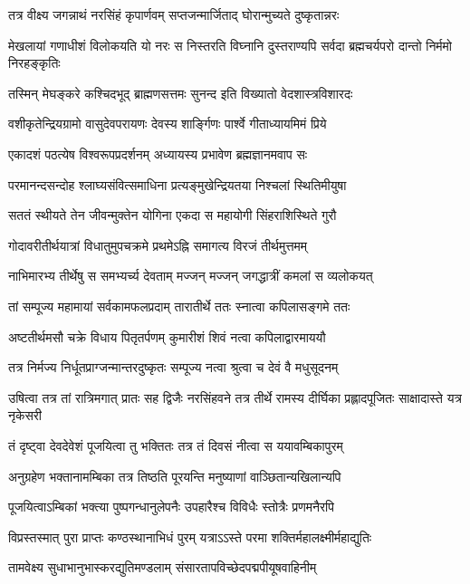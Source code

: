 \twolineshloka
{तत्र वीक्ष्य जगन्नाथं नरसिंहं कृपार्णवम्}
{सप्तजन्मार्जिताद् घोरान्मुच्यते दुष्कृतान्नरः} %

\threelineshloka
{मेखलायां गणाधीशं विलोकयति यो नरः}
{स निस्तरति विघ्नानि दुस्तराण्यपि सर्वदा}
{ब्रह्मचर्यपरो दान्तो निर्ममो निरहङ्कृतिः} %

\twolineshloka
{तस्मिन् मेघङ्करे कश्चिदभूद् ब्राह्मणसत्तमः}
{सुनन्द इति विख्यातो वेदशास्त्रविशारदः} %

\twolineshloka
{वशीकृतेन्द्रियग्रामो वासुदेवपरायणः}
{देवस्य शार्ङ्गिणः पार्श्वे गीताध्यायमिमं प्रिये} %

\twolineshloka
{एकादशं पठत्येष विश्वरूपप्रदर्शनम्}
{अध्यायस्य प्रभावेण ब्रह्मज्ञानमवाप सः} %

\twolineshloka
{परमानन्दसन्दोह श्लाघ्यसंवित्समाधिना}
{प्रत्यङ्मुखेन्द्रियतया निश्चलां स्थितिमीयुषा} %

\twolineshloka
{सततं स्थीयते तेन जीवन्मुक्तेन योगिना}
{एकदा स महायोगी सिंहराशिस्थिते गुरौ} %

\twolineshloka
{गोदावरीतीर्थयात्रां विधातुमुपचक्रमे}
{प्रथमेऽह्नि समागत्य विरजं तीर्थमुत्तमम्} %

\twolineshloka
{नाभिमारभ्य तीर्थेषु स समभ्यर्च्य देवताम्}
{मज्जन् मज्जन् जगद्धात्रीं कमलां स व्यलोकयत्} %

\twolineshloka
{तां सम्पूज्य महामायां सर्वकामफलप्रदाम्}
{तारातीर्थे ततः स्नात्वा कपिलासङ्गमे ततः} %

\twolineshloka
{अष्टतीर्थमसौ चक्रे विधाय पितृतर्पणम्}
{कुमारीशं शिवं नत्वा कपिलाद्वारमाययौ} %

\twolineshloka
{तत्र निर्मज्य निर्धूतप्राग्जन्मान्तरदुष्कृतः}
{सम्पूज्य नत्वा श्रुत्वा च देवं वै मधुसूदनम्} %

\threelineshloka
{उषित्वा तत्र तां रात्रिमगात् प्रातः सह द्विजैः}
{नरसिंहवने तत्र तीर्थे रामस्य दीर्घिका}
{प्रह्लादपूजितः साक्षादास्ते यत्र नृकेसरी} %

\twolineshloka
{तं दृष्ट्वा देवदेवेशं पूजयित्वा तु भक्तितः}
{तत्र तं दिवसं नीत्वा स ययावम्बिकापुरम्} %

\twolineshloka
{अनुग्रहेण भक्तानामम्बिका तत्र तिष्ठति}
{पूरयन्ति मनुष्याणां वाञ्छितान्यखिलान्यपि} %

\twolineshloka
{पूजयित्वाऽम्बिकां भक्त्या पुष्पगन्धानुलेपनैः}
{उपहारैश्च विविधैः स्तोत्रैः प्रणमनैरपि} %

\twolineshloka
{विप्रस्तस्मात् पुरा प्राप्तः कण्ठस्थानाभिधं पुरम्}
{यत्राऽऽस्ते परमा शक्तिर्महालक्ष्मीर्महाद्युतिः} %

\twolineshloka
{तामवेक्ष्य सुधाभानुभास्करद्युतिमण्डलाम्}
{संसारतापविच्छेदपद्मपीयूषवाहिनीम्} %

